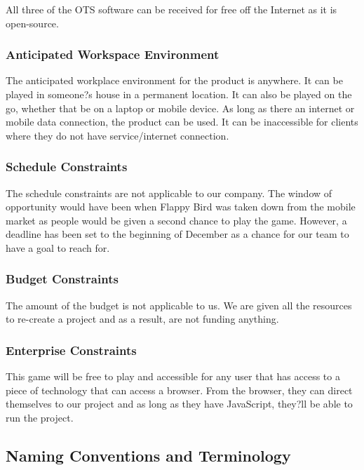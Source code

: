 \documentclass[11pt, oneside]{article}   	%
\begin{document}
All three of the OTS software can be received for free off the Internet as it is open-source.


\subsubsection*{Anticipated Workspace Environment}
The anticipated workplace environment for the product is anywhere. It can be played in someone?s house in a permanent location. It can also be played on the go, whether that be on a laptop or mobile device. As long as there an internet or mobile data connection, the product can be used. It can be inaccessible for clients where they do not have service/internet connection.


\subsubsection*{Schedule Constraints}
The schedule constraints are not applicable to our company.  The window of opportunity would have been when Flappy Bird was taken down from the mobile market as people would be given a second chance to play the game. However, a deadline has been set to the beginning of December as a chance for our team to have a goal to reach for.


\subsubsection*{Budget Constraints}
The amount of the budget is not applicable to us. We are given all the resources to re-create a project and as a result, are not funding anything.


\subsubsection*{Enterprise Constraints}
This game will be free to play and accessible for any user that has access to a piece of technology that can access a browser. From the browser, they can direct themselves to our project and as long as they have JavaScript, they?ll be able to run the project.


\subsection*{Naming Conventions and Terminology}
\end{document}
